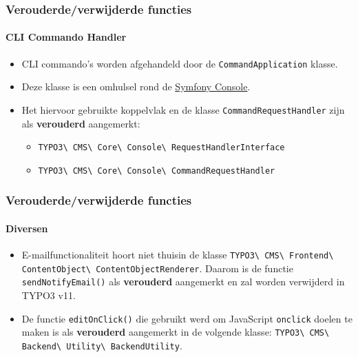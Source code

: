 \begin{frame}[fragile]
	\frametitle{Verouderde/verwijderde functies}
	\framesubtitle{CLI Commando Handler}

	\begin{itemize}
		\item CLI commando's worden afgehandeld door de \texttt{CommandApplication} klasse.
		\item Deze klasse is een omhulsel rond de
			\href{https://symfony.com/doc/current/components/console.html}{Symfony Console}.

		\item Het hiervoor gebruikte koppelvlak en de klasse \texttt{CommandRequestHandler} zijn als \textbf{verouderd} aangemerkt:

			\begin{itemize}
				\item
					\texttt{TYPO3\textbackslash
						CMS\textbackslash
						Core\textbackslash
						Console\textbackslash
						RequestHandlerInterface}
				\item
					\texttt{TYPO3\textbackslash
						CMS\textbackslash
						Core\textbackslash
						Console\textbackslash
						CommandRequestHandler}
			\end{itemize}

	\end{itemize}

\end{frame}


\begin{frame}[fragile]
	\frametitle{Verouderde/verwijderde functies}
	\framesubtitle{Diversen}

	\begin{itemize}
		\item E-mailfunctionaliteit hoort niet thuisin de klasse\newline
			\small
				\texttt{TYPO3\textbackslash
					CMS\textbackslash
					Frontend\textbackslash
					ContentObject\textbackslash
					ContentObjectRenderer}.\newline
			\normalsize
			Daarom is de functie \texttt{sendNotifyEmail()} als \textbf{verouderd} aangemerkt en zal worden verwijderd in TYPO3 v11.

		\item De functie \texttt{editOnClick()} die gebruikt werd om JavaScript \texttt{onclick} doelen te maken
			is als \textbf{verouderd} aangemerkt in de volgende klasse:\newline
			\small
				\texttt{TYPO3\textbackslash
					CMS\textbackslash
					Backend\textbackslash
					Utility\textbackslash
					BackendUtility}.
			\normalsize

	\end{itemize}

\end{frame}

